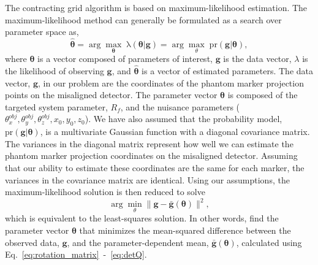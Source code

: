 The contracting grid algorithm is based on maximum-likelihood estimation.  The maximum-likelihood method can generally be formulated as a search over parameter space as,
%
\begin{equation}
\label{eq:mlem}
\mathrm{\boldsymbol{\hat{\theta}}} = \arg\max_{\mathbf{\theta}} \; \mathrm{\lambda (\boldsymbol{\theta} | \mathbf{g})} = \arg\max_{\theta} \; \mathrm{pr( \mathbf{g}|\boldsymbol{\theta})},
\end{equation}
%
where $\boldsymbol{\theta}$ is a vector composed of parameters of interest, $\mathbf{g}$ is the data vector, $\lambda$ is the likelihood of observing $\mathbf{g}$, and $\boldsymbol{\hat{\theta}}$ is a vector of estimated parameters.  The data vector, $\mathbf{g}$, in our problem are the coordinates of the phantom marker projection points on the misaligned detector. The parameter vector $\boldsymbol{\theta}$ is composed of the targeted system parameter, $R_f$, and the nuisance parameters ($\theta_x^{obj}, \theta_y^{obj}, \theta_z^{obj}, x_0, y_0, z_0$).  We have also assumed that the probability model, $\mathrm{pr( \mathbf{g}|\boldsymbol{\theta})}$, is a multivariate Gaussian function with a diagonal covariance matrix.  The variances in the diagonal matrix represent how well we can estimate the phantom marker projection coordinates on the misaligned detector.  Assuming that our ability to estimate these coordinates are the same for each marker, the variances in the covariance matrix are identical.  Using our assumptions, the maximum-likelihood solution is then reduced to solve
%
\begin{equation}
\arg\min_{\theta} \| \mathbf{g} - \mathbf{\bar{g}}(\mathbf{\theta}) \|^2,
\label{eq:least_square}
\end{equation}
%
which is equivalent to the least-squares solution.  In other words, find the parameter vector $\boldsymbol{\theta}$ that minimizes the mean-squared difference between the observed data, $\mathbf{g}$, and the parameter-dependent mean, $\mathbf{\bar{g}}\mathbf{(\theta)}$, calculated using Eq.~\ref{eq:rotation_matrix}~-~\ref{eq:detQ}.  

